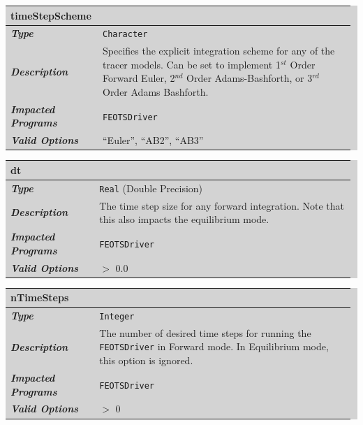\documentclass{softwaremanual}
\begin{document}
\noindent\begingroup\setlength{\fboxsep}{0pt}
\colorbox{lightgray}{
\begin{tabular}{p{0.25\linewidth} p{0.725\linewidth}}
\toprule
\textbf{timeStepScheme} & \\
\midrule
\textbf{\textit{Type}} & \texttt{Character} \\
\midrule
\textbf{\textit{Description}} & Specifies the explicit integration scheme for any of the tracer models. Can be set to implement 1$^{st}$ Order Forward Euler, 2$^{nd}$ Order Adams-Bashforth, or 3$^{rd}$ Order Adams Bashforth. \\
\midrule
\textbf{\textit{Impacted Programs}} & \texttt{FEOTSDriver} \\
\midrule
\textbf{\textit{Valid Options}}  & ``Euler'', ``AB2'', ``AB3'' \\
\bottomrule
\end{tabular}
}\endgroup


\noindent\begingroup\setlength{\fboxsep}{0pt}
\colorbox{lightgray}{
\begin{tabular}{p{0.25\linewidth} p{0.725\linewidth}}
\toprule
\textbf{dt} & \\
\midrule
\textbf{\textit{Type}} & \texttt{Real} (Double Precision) \\
\midrule
\textbf{\textit{Description}} & The time step size for any forward integration. Note that this also impacts the equilibrium mode.  \\
\midrule
\textbf{\textit{Impacted Programs}} &  \texttt{FEOTSDriver} \\
\midrule
\textbf{\textit{Valid Options}}  & $>$ 0.0 \\
\bottomrule
\end{tabular}
}\endgroup


\noindent\begingroup\setlength{\fboxsep}{0pt}
\colorbox{lightgray}{
\begin{tabular}{p{0.25\linewidth} p{0.725\linewidth}}
\toprule
\textbf{nTimeSteps} & \\
\midrule
\textbf{\textit{Type}} & \texttt{Integer} \\
\midrule
\textbf{\textit{Description}} & The number of desired time steps for running the \texttt{FEOTSDriver} in Forward mode. In Equilibrium mode, this option is ignored.  \\
\midrule
\textbf{\textit{Impacted Programs}} & \texttt{FEOTSDriver} \\
\midrule
\textbf{\textit{Valid Options}}  & $>$ 0 \\
\bottomrule
\end{tabular}
}\endgroup
\end{document}
